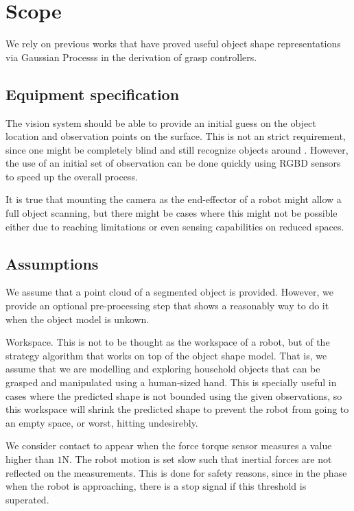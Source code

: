 \documentclass[twocolumn,draft,natbib]{svjour3}
\begin{document}
\section{Scope}
\label{sec:scope}

We rely on previous works that have proved useful object shape representations via Gaussian Processs in the derivation of grasp controllers.

\subsection{Equipment specification}
\label{sec:equipment}

The vision system should be able to provide an initial guess on the object location and observation points on the surface. This is not an strict requirement, since one might be completely blind and still recognize objects around \citep[see e.g.]{Petrovskaya2011Global}. However, the use of an initial set of observation can be done quickly using RGBD sensors to speed up the overall process. 

It is true that mounting the camera as the end-effector of a robot might allow a full object scanning, but there might be cases where this  might not be possible either due to reaching limitations or even sensing capabilities on reduced spaces.

\subsection{Assumptions}
\label{sec:limitations}

We assume that a point cloud of a segmented object is provided. However, we provide an optional pre-processing step that shows a reasonably way to do it when the object model is unkown.

Workspace. This is not to be thought as the workspace of a robot, but of the strategy algorithm that works on top of the object shape model. That is, we assume that we are modelling and exploring household objects that can be grasped and manipulated using a human-sized hand. This is specially useful in cases where the predicted shape is not bounded using the given observations, so this workspace will shrink the predicted shape to prevent the robot from going to an empty space, or worst, hitting undesirebly. 

We consider contact to appear when the force torque sensor measures a value higher than $1$N. The robot motion is set slow such that inertial forces are not reflected on the measurements. This is done for safety reasons, since in the phase when the robot is approaching, there is a stop signal if this threshold is superated.
\end{document}
